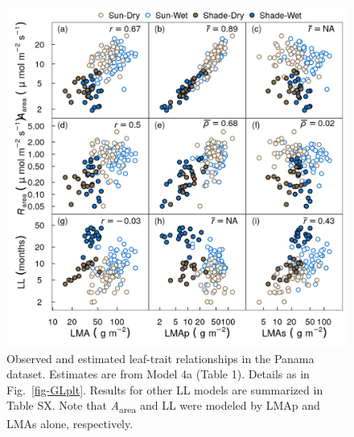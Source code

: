 \documentclass[
  12pt,
  a4paper,
,tablecaptionabove
]{scrartcl}
\begin{document}
\begin{figure}

{\centering \includegraphics{../figs/pa_point.png}

}

\caption{\label{fig-PAplt}Observed and estimated leaf-trait
relationships in the Panama dataset. Estimates are from Model 4a (Table
1). Details as in Fig.~\ref{fig-GLplt}. Results for other LL models are
summarized in Table SX. Note that \emph{A}\textsubscript{area} and LL
were modeled by LMAp and LMAs alone, respectively.}

\end{figure}

\newpage
\end{document}
